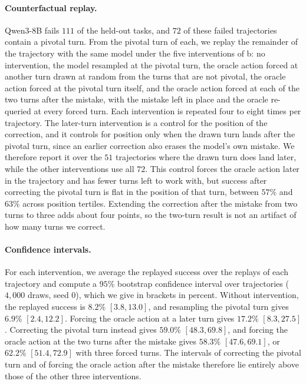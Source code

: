 \paragraph{Counterfactual replay.} Qwen3-8B fails $111$ of the held-out tasks, and $72$ of these failed trajectories contain a pivotal turn. From the pivotal turn of each, we replay the remainder of the trajectory with the same model under the five interventions of b: no intervention, the model resampled at the pivotal turn, the oracle action forced at another turn drawn at random from the turns that are not pivotal, the oracle action forced at the pivotal turn itself, and the oracle action forced at each of the two turns after the mistake, with the mistake left in place and the oracle re-queried at every forced turn. Each intervention is repeated four to eight times per trajectory. The later-turn intervention is a control for the position of the correction, and it controls for position only when the drawn turn lands after the pivotal turn, since an earlier correction also erases the model's own mistake. We therefore report it over the $51$ trajectories where the drawn turn does land later, while the other interventions use all $72$. This control forces the oracle action later in the trajectory and has fewer turns left to work with, but success after correcting the pivotal turn is flat in the position of that turn, between $57\%$ and $63\%$ across position tertiles. Extending the correction after the mistake from two turns to three adds about four points, so the two-turn result is not an artifact of how many turns we correct.

\paragraph{Confidence intervals.} For each intervention, we average the replayed success over the replays of each trajectory and compute a $95\%$ bootstrap confidence interval over trajectories ($4{,}000$ draws, seed $0$), which we give in brackets in percent. Without intervention, the replayed success is $8.2\%$ $[3.8, 13.0]$, and resampling the pivotal turn gives $6.9\%$ $[2.4, 12.2]$. Forcing the oracle action at a later turn gives $17.2\%$ $[8.3, 27.5]$. Correcting the pivotal turn instead gives $59.0\%$ $[48.3, 69.8]$, and forcing the oracle action at the two turns after the mistake gives $58.3\%$ $[47.6, 69.1]$, or $62.2\%$ $[51.4, 72.9]$ with three forced turns. The intervals of correcting the pivotal turn and of forcing the oracle action after the mistake therefore lie entirely above those of the other three interventions.

